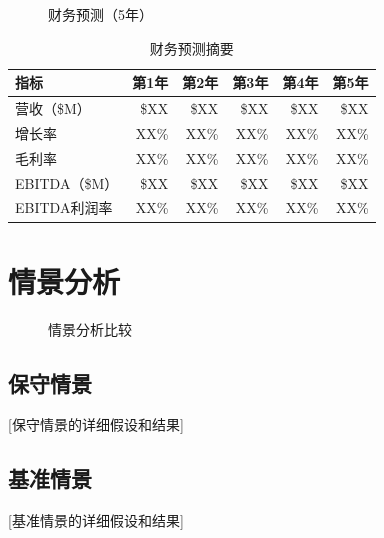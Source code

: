 \documentclass[11pt,letterpaper]{report}
\begin{document}
{\begin{figure}[htbp]
\centering
\caption{财务预测（5年）}
\label{fig:financials}
\end{figure}

\begin{table}[htbp]
\centering
\caption{财务预测摘要}
\begin{tabular}{@{}lrrrrr@{}}
\toprule
\textbf{指标} & \textbf{第1年} & \textbf{第2年} & \textbf{第3年} & \textbf{第4年} & \textbf{第5年} \\
\midrule
营收（\$M） & \$XX & \$XX & \$XX & \$XX & \$XX \\
\rowcolor{tablealt} 增长率 & XX\% & XX\% & XX\% & XX\% & XX\% \\
毛利率 & XX\% & XX\% & XX\% & XX\% & XX\% \\
\rowcolor{tablealt} EBITDA（\$M） & \$XX & \$XX & \$XX & \$XX & \$XX \\
EBITDA利润率 & XX\% & XX\% & XX\% & XX\% & XX\% \\
\bottomrule
\end{tabular}
\label{tab:financials}
\end{table}

\section{情景分析}


\begin{figure}[htbp]
\centering
\caption{情景分析比较}
\label{fig:scenarios}
\end{figure}

\subsection{保守情景}
[保守情景的详细假设和结果]

\subsection{基准情景}
[基准情景的详细假设和结果]

}
\end{document}
